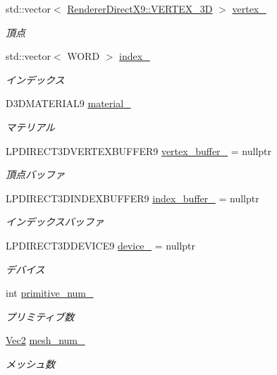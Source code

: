 \begin{DoxyCompactItemize}
\item 
std\+::vector$<$ \mbox{\hyperlink{class_renderer_direct_x9_1_1_v_e_r_t_e_x__3_d}{Renderer\+Direct\+X9\+::\+V\+E\+R\+T\+E\+X\+\_\+3D}} $>$ \mbox{\hyperlink{class_mesh_plane_polygon_a9736e54f457231deee711a2310a0ee2a}{vertex\+\_\+}}
\begin{DoxyCompactList}\small\item\em 頂点 \end{DoxyCompactList}\item 
std\+::vector$<$ W\+O\+RD $>$ \mbox{\hyperlink{class_mesh_plane_polygon_ad97af9abf051fc90ab9b9086dbc9a2f9}{index\+\_\+}}
\begin{DoxyCompactList}\small\item\em インデックス \end{DoxyCompactList}\item 
D3\+D\+M\+A\+T\+E\+R\+I\+A\+L9 \mbox{\hyperlink{class_mesh_plane_polygon_aa6eb3d4fe11c9a123062705cf0f4a19d}{material\+\_\+}}
\begin{DoxyCompactList}\small\item\em マテリアル \end{DoxyCompactList}\item 
L\+P\+D\+I\+R\+E\+C\+T3\+D\+V\+E\+R\+T\+E\+X\+B\+U\+F\+F\+E\+R9 \mbox{\hyperlink{class_mesh_plane_polygon_a71ae2d4bea783da57a1b0ec4f6a53971}{vertex\+\_\+buffer\+\_\+}} = nullptr
\begin{DoxyCompactList}\small\item\em 頂点バッファ \end{DoxyCompactList}\item 
L\+P\+D\+I\+R\+E\+C\+T3\+D\+I\+N\+D\+E\+X\+B\+U\+F\+F\+E\+R9 \mbox{\hyperlink{class_mesh_plane_polygon_a17bd62b6c90611fbbd42cdca17cce573}{index\+\_\+buffer\+\_\+}} = nullptr
\begin{DoxyCompactList}\small\item\em インデックスバッファ \end{DoxyCompactList}\item 
L\+P\+D\+I\+R\+E\+C\+T3\+D\+D\+E\+V\+I\+C\+E9 \mbox{\hyperlink{class_mesh_plane_polygon_a58be2f5d0a6f3baf38a515dc8ef201ac}{device\+\_\+}} = nullptr
\begin{DoxyCompactList}\small\item\em デバイス \end{DoxyCompactList}\item 
int \mbox{\hyperlink{class_mesh_plane_polygon_a56aa85d634268bc98a1f7cc144547385}{primitive\+\_\+num\+\_\+}}
\begin{DoxyCompactList}\small\item\em プリミティブ数 \end{DoxyCompactList}\item 
\mbox{\hyperlink{_vector3_d_8h_a5ef6e95dfc5f9d3820b71772d99bbc25}{Vec2}} \mbox{\hyperlink{class_mesh_plane_polygon_ab55f12bf7d9cac682cc53b93a19b0056}{mesh\+\_\+num\+\_\+}}
\begin{DoxyCompactList}\small\item\em メッシュ数 \end{DoxyCompactList}\end{DoxyCompactItemize}
